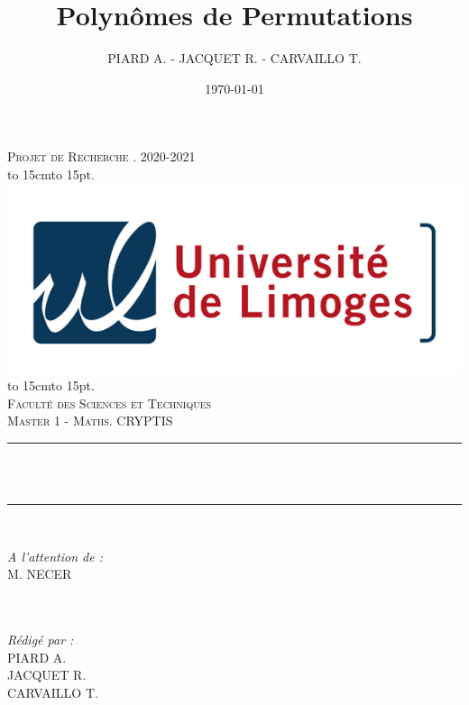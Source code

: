 \documentclass[12pt]{article}
\title{Polynômes de Permutations}
\author{PIARD A. - JACQUET R. - CARVAILLO T.}
\date{\today}
\makeatletter
\let\thetitle\@title
\def\dotfill#1{\cleaders\hbox to #1{.}\hfill}
\newcommand\dotline[2][.5em]{\leavevmode\hbox to #2{\dotfill{#1}\hfil}}
\makeatother
\begin{document}

\begin{titlepage}
	\centering
    \vspace*{0.5 cm}
    \textsc{\LARGE Projet de Recherche . 2020-2021}\\[1.0 cm]
    \dotline[15pt]{15cm}\\
	\includegraphics[scale = 2.2]{logo.png}
	\dotline[15pt]{15cm}\\
	\vspace{1.5cm}
	\textsc{\Large Faculté des Sciences et Techniques}\\
	\textsc{\large Master 1 - Maths. CRYPTIS}\\[1.0 cm]
	\rule{\linewidth}{0.2 mm} \\[0.4 cm]
	{ \huge \bfseries \color{blue} \thetitle}\\
	\rule{\linewidth}{0.2 mm} \\[1.5 cm]
	
	\begin{minipage}{0.4\textwidth}
		\begin{flushleft} \large
			\emph{A l'attention de :}\\
			M. NECER\\
			\phantom{a}\\
			\phantom{a}\\
		\end{flushleft}
	\end{minipage}
	\begin{minipage}{0.5\textwidth}
    	\begin{flushright} \large
		\emph{Rédigé par :}\\
		PIARD A.\\
		JACQUET R.\\
		CARVAILLO T.\\
		\end{flushright}
	\end{minipage}\\[2 cm]
\end{titlepage}
\end{document}
